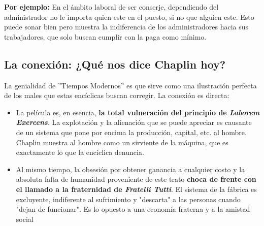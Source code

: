 \documentclass[a4paper,12pt]{article}
\begin{document}
\textbf{Por ejemplo:} En el ámbito laboral de ser conserje, dependiendo del administrador no le importa quien este en el puesto, si no que alguien este. Esto puede sonar bien pero muestra la indiferencia de los administradores hacia sus trabajadores, que solo buscan cumplir con la paga como mínimo.

\subsection{La conexión: ¿Qué nos dice Chaplin hoy?}
La genialidad de ''Tiempos Modernos'' es que sirve como una ilustración perfecta de los males que estas encíclicas buscan corregir. La conexión es directa:

\begin{itemize}
    \item La película es, en esencia, \textbf{la total vulneración del principio de \textit{Laborem Exercens}}. La explotación y la alienación que se puede apreciar es causante de un sistema que pone por encima la producción, capital, etc. al hombre. Chaplin muestra al hombre como un sirviente de la máquina, que es exactamente lo que la encíclica denuncia.
    \item Al mismo tiempo, la obsesión por obtener ganancia a cualquier costo y la absoluta falta de humanidad proveniente de este trato \textbf{choca de frente con el llamado a la fraternidad de \textit{Fratelli Tutti}}. El sistema de la fábrica es excluyente, indiferente al sufrimiento y "descarta" a las personas cuando "dejan de funcionar". Es lo opuesto a una economía fraterna y a la amistad social
\end{itemize}
\end{document}
